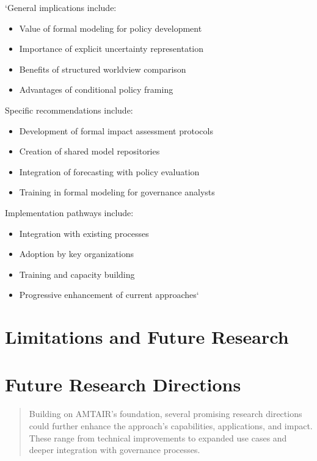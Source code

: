 \documentclass[
  11pt,
  letterpaper,
]{book}
\providecommand{\tightlist}{%
  \setlength{\itemsep}{0pt}\setlength{\parskip}{0pt}}
\begin{document}
`General implications include:

\begin{itemize}
\tightlist
\item
  Value of formal modeling for policy development
\item
  Importance of explicit uncertainty representation
\item
  Benefits of structured worldview comparison
\item
  Advantages of conditional policy framing
\end{itemize}

Specific recommendations include:

\begin{itemize}
\tightlist
\item
  Development of formal impact assessment protocols
\item
  Creation of shared model repositories
\item
  Integration of forecasting with policy evaluation
\item
  Training in formal modeling for governance analysts
\end{itemize}

Implementation pathways include:

\begin{itemize}
\tightlist
\item
  Integration with existing processes
\item
  Adoption by key organizations
\item
  Training and capacity building
\item
  Progressive enhancement of current approaches`
\end{itemize}

\section{Limitations and Future Research}\label{sec-future-research3}

\section{Future Research Directions}\label{future-research-directions}

\begin{quote}
Building on AMTAIR's foundation, several promising research directions
could further enhance the approach's capabilities, applications, and
impact. These range from technical improvements to expanded use cases
and deeper integration with governance processes.
\end{quote}
\end{document}
